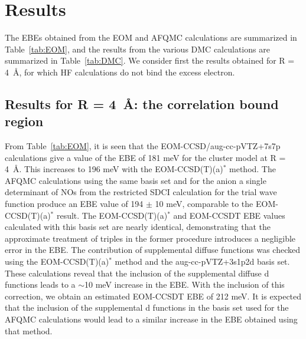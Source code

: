 \section{Results}
The EBEs obtained from the EOM and AFQMC calculations are summarized in Table~\ref{tab:EOM}, and the results from the various DMC calculations are summarized in Table~\ref{tab:DMC}.
We consider first the results obtained for R = \SI{4}{\angstrom}, for which HF calculations do not bind the excess electron. 

\subsection{Results for R = \SI{4}{\angstrom}: the correlation bound region}
From Table~\ref{tab:EOM}, it is seen that the EOM-CCSD/aug-cc-pVTZ+7s7p calculations give a value of the EBE of 181 meV for the  cluster model at R = \SI{4}{\angstrom}.
This increases to 196 meV with the EOM-CCSD(T)(a)$^*$ method.
The AFQMC calculations using the same basis set and for the anion a single determinant of NOs from the restricted SDCI calculation for the trial wave function produce an EBE value of 194 $\pm$ 10 meV, comparable to the EOM-CCSD(T)(a)$^*$ result. 
The EOM-CCSD(T)(a)$^*$ and EOM-CCSDT EBE values calculated with this basis set are nearly identical, demonstrating that the approximate treatment of triples in the former procedure introduces a negligible error in the EBE.
The contribution of supplemental diffuse functions was checked using the EOM-CCSD(T)(a)$^*$ method and the aug-cc-pVTZ+3s1p2d basis set.
These calculations reveal that the inclusion of the supplemental diffuse d functions leads to a $\sim$10 meV increase in the EBE. With the inclusion of this correction, we obtain an estimated EOM-CCSDT EBE of 212 meV. It is expected that the inclusion of the supplemental d functions in the basis set used for the AFQMC calculations would lead to a similar increase in the EBE obtained using that method.

